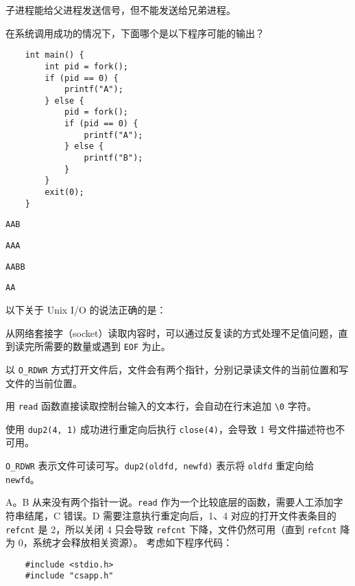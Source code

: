 \begin{problems}
\begin{choices}
            \item 子进程能给父进程发送信号，但不能发送给兄弟进程。
        \end{choices}
         在系统调用成功的情况下，下面哪个是以下程序可能的输出？
        \begin{verbatim}
    int main() {
        int pid = fork();
        if (pid == 0) {
            printf("A");
        } else {
            pid = fork();
            if (pid == 0) {
                printf("A");
            } else {
                printf("B");
            }
        }
        exit(0);
    }
        \end{verbatim}
        \begin{choices}
            \item \verb|AAB|
            \item \verb|AAA|
            \item \verb|AABB|
            \item \verb|AA|
        \end{choices}
         以下关于 Unix I/O 的说法正确的是：
        \begin{choices}
            \item 从网络套接字（socket）读取内容时，可以通过反复读的方式处理不足值问题，直到读完所需要的数量或遇到 \verb|EOF| 为止。
            \item 以 \verb|O_RDWR| 方式打开文件后，文件会有两个指针，分别记录读文件的当前位置和写文件的当前位置。
            \item 用 \verb|read| 函数直接读取控制台输入的文本行，会自动在行末追加 \verb|\0| 字符。
            \item 使用 \verb|dup2(4, 1)| 成功进行重定向后执行 \verb|close(4)|，会导致 1 号文件描述符也不可用。
        \end{choices}
        \begin{hint}
            \verb|O_RDWR| 表示文件可读可写。\verb|dup2(oldfd, newfd)| 表示将 \verb|oldfd| 重定向给 \verb|newfd|。
        \end{hint}
        \sol A。B 从来没有两个指针一说。\verb|read| 作为一个比较底层的函数，需要人工添加字符串结尾，C 错误。D 需要注意执行重定向后，1、4 对应的打开文件表条目的 \verb|refcnt| 是 2，所以关闭 4 只会导致 \verb|refcnt| 下降，文件仍然可用（直到 \verb|refcnt| 降为 0，系统才会释放相关资源）。
         考虑如下程序代码：
        \begin{verbatim}
    #include <stdio.h>
    #include "csapp.h"

\end{verbatim}
\end{problems}

